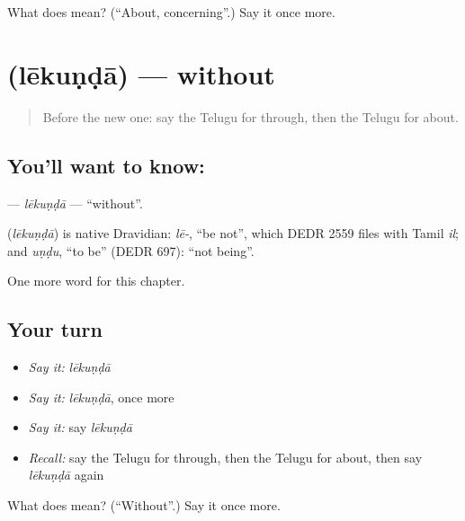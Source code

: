 \begin{tcolorbox}[breakable,colback=teal!4,colframe=teal!35!black,title={Before you move on}]
What does  mean? (\textquotedblleft{}About, concerning\textquotedblright{}.) Say it once more.
\end{tcolorbox}
\section[\texorpdfstring{\te{లేకుండా} (lēkuṇḍā)}{లేకుండా (lēkuṇḍā)}]{ (lēkuṇḍā) — without}

\label{lesson:TE-C176-lekunda}



\begin{quote}
Before the new one: say the Telugu for through, then the Telugu for about.
\end{quote}

\subsection*{You'll want to know: }
\textbf{} — \emph{lēkuṇḍā} — \textquotedblleft{}without\textquotedblright{}.

\begin{cousinweb}
\textbf{} (\emph{lēkuṇḍā}) is native Dravidian: \emph{lē-}, \textquotedblleft{}be not\textquotedblright{}, which DEDR 2559 files with Tamil \emph{il}; and \emph{uṇḍu}, \textquotedblleft{}to be\textquotedblright{} (DEDR 697): \textquotedblleft{}not being\textquotedblright{}.
\end{cousinweb}

\begin{grammarlens}[title={What you've built}]
One more word for this chapter.
\end{grammarlens}

\subsection*{Your turn}
\begin{itemize}
\raggedright
  \item \emph{Say it:} \emph{lēkuṇḍā}
  \item \emph{Say it:} \emph{lēkuṇḍā}, once more
  \item \emph{Say it:} say \emph{lēkuṇḍā}
  \item \emph{Recall:} say the Telugu for through, then the Telugu for about, then say \emph{lēkuṇḍā} again
\end{itemize}

\begin{tcolorbox}[breakable,colback=teal!4,colframe=teal!35!black,title={Before you move on}]
What does  mean? (\textquotedblleft{}Without\textquotedblright{}.) Say it once more.
\end{tcolorbox}
